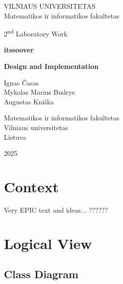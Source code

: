 \documentclass[11pt,a4paper]{article}
\begin{document}

\begin{titlepage}
    \centering
    \thispagestyle{empty}
    
    {\Large VILNIAUS UNIVERSITETAS\\
    Matematikos ir informatikos fakultetas}\par
    
    \vspace{3cm} %
    
    {\Large 2\textsuperscript{nd} Laboratory Work}\par
    \vspace{0.5cm}
    {\Large \textbf{itssoover}}\par
    {\Large \textbf{Design and Implementation}}\par
    
    \vspace{3cm}
    
    {\large
    Ignas Časas\\
    Mykolas Marius Budrys\\
    Augustas Kniška
    }\par
    
    \vspace{8cm}
    
    {\large
    Matematikos ir informatikos fakultetas\\
    Vilniaus universitetas\\
    Lietuva
    }\par
    
    \vfill

    \large 2025
    
\end{titlepage}

\tableofcontents

\section{Context}
 Very EPIC text and ideas...
 ??????

\section{Logical View}

\subsection{Class Diagram}
\end{document}

